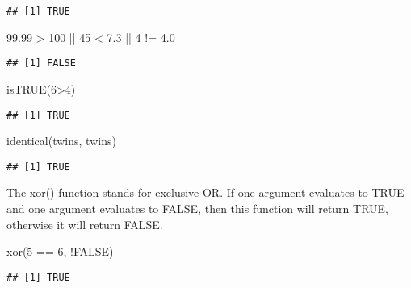 \documentclass[
]{book}
\newenvironment{Shaded}{\begin{snugshade}}{\end{snugshade}}
\newcommand{\ConstantTok}[1]{\textcolor[rgb]{0.00,0.00,0.00}{#1}}
\newcommand{\DecValTok}[1]{\textcolor[rgb]{0.00,0.00,0.81}{#1}}
\newcommand{\FloatTok}[1]{\textcolor[rgb]{0.00,0.00,0.81}{#1}}
\newcommand{\FunctionTok}[1]{\textcolor[rgb]{0.00,0.00,0.00}{#1}}
\newcommand{\NormalTok}[1]{#1}
\newcommand{\SpecialCharTok}[1]{\textcolor[rgb]{0.00,0.00,0.00}{#1}}
\newcommand{\StringTok}[1]{\textcolor[rgb]{0.31,0.60,0.02}{#1}}
\begin{document}
\begin{verbatim}
## [1] TRUE
\end{verbatim}

\begin{Shaded}
\begin{Highlighting}[]
\FloatTok{99.99} \SpecialCharTok{\textgreater{}} \DecValTok{100} \SpecialCharTok{||} \DecValTok{45} \SpecialCharTok{\textless{}} \FloatTok{7.3} \SpecialCharTok{||} \DecValTok{4} \SpecialCharTok{!=} \FloatTok{4.0}
\end{Highlighting}
\end{Shaded}

\begin{verbatim}
## [1] FALSE
\end{verbatim}

\begin{Shaded}
\begin{Highlighting}[]
\FunctionTok{isTRUE}\NormalTok{(}\DecValTok{6}\SpecialCharTok{\textgreater{}}\DecValTok{4}\NormalTok{)}
\end{Highlighting}
\end{Shaded}

\begin{verbatim}
## [1] TRUE
\end{verbatim}

\begin{Shaded}
\begin{Highlighting}[]
\FunctionTok{identical}\NormalTok{(}\StringTok{\textquotesingle{}twins\textquotesingle{}}\NormalTok{, }\StringTok{\textquotesingle{}twins\textquotesingle{}}\NormalTok{)}
\end{Highlighting}
\end{Shaded}

\begin{verbatim}
## [1] TRUE
\end{verbatim}

The xor() function stands for exclusive OR. If one argument evaluates to TRUE and one argument evaluates to FALSE, then this function will return TRUE, otherwise it will return FALSE.

\begin{Shaded}
\begin{Highlighting}[]
\FunctionTok{xor}\NormalTok{(}\DecValTok{5} \SpecialCharTok{==} \DecValTok{6}\NormalTok{, }\SpecialCharTok{!}\ConstantTok{FALSE}\NormalTok{)}
\end{Highlighting}
\end{Shaded}

\begin{verbatim}
## [1] TRUE
\end{verbatim}
\end{document}
